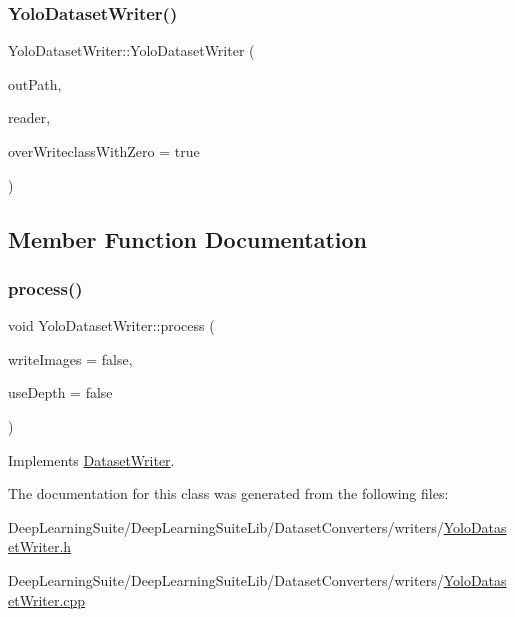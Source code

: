 \subsubsection{\texorpdfstring{Yolo\+Dataset\+Writer()}{YoloDatasetWriter()}}
{\footnotesize\ttfamily Yolo\+Dataset\+Writer\+::\+Yolo\+Dataset\+Writer (\begin{DoxyParamCaption}\item[{const std\+::string \&}]{out\+Path,  }\item[{\hyperlink{_dataset_reader_8h_a30d89cba514a220d64d04535c0465f1c}{Dataset\+Reader\+Ptr} \&}]{reader,  }\item[{bool}]{over\+Writeclass\+With\+Zero = {\ttfamily true} }\end{DoxyParamCaption})}



\subsection{Member Function Documentation}
\mbox{\label{class_yolo_dataset_writer_a29ecb0d94701fc78b0b800d9665ca70d}} 
\subsubsection{\texorpdfstring{process()}{process()}}
{\footnotesize\ttfamily void Yolo\+Dataset\+Writer\+::process (\begin{DoxyParamCaption}\item[{bool}]{write\+Images = {\ttfamily false},  }\item[{bool}]{use\+Depth = {\ttfamily false} }\end{DoxyParamCaption})\hspace{0.3cm}{\ttfamily [virtual]}}



Implements \hyperlink{class_dataset_writer_a97270b2e182e6c08d9342d8db42710fd}{Dataset\+Writer}.



The documentation for this class was generated from the following files\+:\begin{DoxyCompactItemize}
\item 
Deep\+Learning\+Suite/\+Deep\+Learning\+Suite\+Lib/\+Dataset\+Converters/writers/\hyperlink{_yolo_dataset_writer_8h}{Yolo\+Dataset\+Writer.\+h}\item 
Deep\+Learning\+Suite/\+Deep\+Learning\+Suite\+Lib/\+Dataset\+Converters/writers/\hyperlink{_yolo_dataset_writer_8cpp}{Yolo\+Dataset\+Writer.\+cpp}\end{DoxyCompactItemize}
